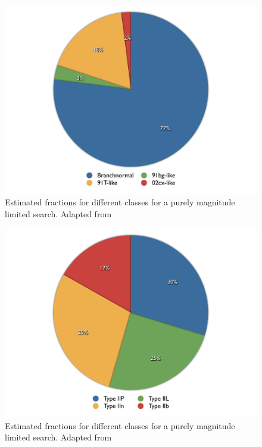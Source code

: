 \begin{figure}[tb] %
   \centering
   \includegraphics[width=\textwidth, trim=0 0cm 0 0cm]{chapter_intro/plots/Li_ia_distrib.pdf} 
   \caption[Fraction of different SN Ia classes]{Estimated fractions for different  classes for a purely magnitude limited search. Adapted from \citet{2011MNRAS.412.1441L}}
   \label{fig:ia_fracs}
\end{figure}

\begin{figure}[tb] %
   \centering
   \includegraphics[width=\textwidth, trim=0 0cm 0 0cm]{chapter_intro/plots/Li_ii_distrib.pdf} 
   \caption[Fraction of different SN II classes]{Estimated fractions for different  classes for a purely magnitude limited search. Adapted from \citet{2011MNRAS.412.1441L}}
   \label{fig:ii_fracs}
\end{figure}


